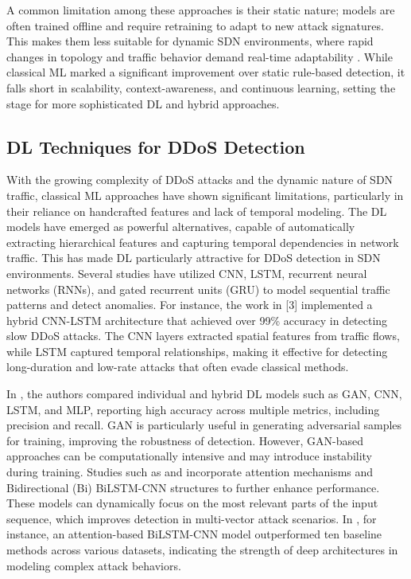 \documentclass[ASNA,twocolumn]{USG} %
\begin{document}
A common limitation among these approaches is their static nature; models are often trained offline and require retraining to adapt to new attack signatures. This makes them less suitable for dynamic SDN environments, where rapid changes in topology and traffic behavior demand real-time adaptability \cite{alqahtani2024incremental}. While classical ML marked a significant improvement over static rule-based detection, it falls short in scalability, context-awareness, and continuous learning, setting the stage for more sophisticated DL and hybrid approaches.



\subsection{DL Techniques for DDoS Detection}

With the growing complexity of DDoS attacks and the dynamic nature of SDN traffic, classical ML approaches have shown significant limitations, particularly in their reliance on handcrafted features and lack of temporal modeling. The DL models have emerged as powerful alternatives, capable of automatically extracting hierarchical features and capturing temporal dependencies in network traffic. This has made DL particularly attractive for DDoS detection in SDN environments. Several studies \cite{nugraha2020deep, novaes2021adversarial, gadze2021investigation, priyadarshini2023sdn} have utilized CNN, LSTM, recurrent neural networks (RNNs),  and gated recurrent units (GRU) to model sequential traffic patterns and detect anomalies. For instance, the work in [3] implemented a hybrid CNN-LSTM architecture that achieved over 99\% accuracy in detecting slow DDoS attacks. The CNN layers extracted spatial features from traffic flows, while LSTM captured temporal relationships, making it effective for detecting long-duration and low-rate attacks that often evade classical methods.

In \cite{novaes2021adversarial}, the authors compared individual and hybrid DL models such as GAN, CNN, LSTM, and MLP, reporting high accuracy across multiple metrics, including precision and recall. GAN is particularly useful in generating adversarial samples for training, improving the robustness of detection. However, GAN-based approaches can be computationally intensive and may introduce instability during training. Studies such as \cite{gadze2021investigation} and \cite{priyadarshini2023sdn} incorporate attention mechanisms and Bidirectional (Bi) BiLSTM-CNN structures to further enhance performance. These models can dynamically focus on the most relevant parts of the input sequence, which improves detection in multi-vector attack scenarios. In \cite{priyadarshini2023sdn}, for instance, an attention-based BiLSTM-CNN model outperformed ten baseline methods across various datasets, indicating the strength of deep architectures in modeling complex attack behaviors.
\end{document}
